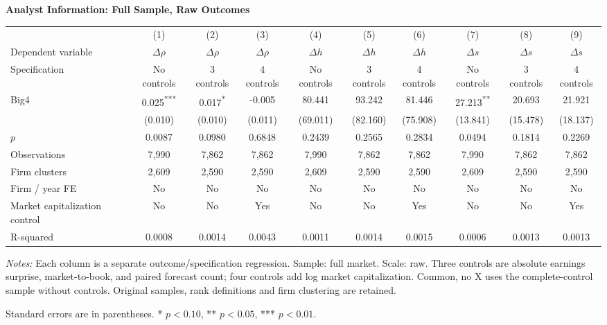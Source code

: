 \documentclass[10pt]{article}
\newcommand{\sym}[1]{\textsuperscript{#1}}
\begin{document}
\begin{minipage}{31.40cm}
\fontsize{10}{12}\selectfont
\setlength{\tabcolsep}{4pt}\renewcommand{\arraystretch}{1.08}
{\large\bfseries Analyst Information: Full Sample, Raw Outcomes}\par\medskip
\begin{tabular*}{\linewidth}{@{\extracolsep{\fill}}lccccccccc@{}}
\toprule
 & (1) & (2) & (3) & (4) & (5) & (6) & (7) & (8) & (9) \\
Dependent variable & $\Delta\rho$ & $\Delta\rho$ & $\Delta\rho$ & $\Delta h$ & $\Delta h$ & $\Delta h$ & $\Delta s$ & $\Delta s$ & $\Delta s$ \\
Specification & No controls & 3 controls & 4 controls & No controls & 3 controls & 4 controls & No controls & 3 controls & 4 controls \\
\midrule
Big4 & 0.025\sym{***} & 0.017\sym{*} & -0.005 & 80.441 & 93.242 & 81.446 & 27.213\sym{**} & 20.693 & 21.921 \\
 & (0.010) & (0.010) & (0.011) & (69.011) & (82.160) & (75.908) & (13.841) & (15.478) & (18.137) \\
$p$ & 0.0087 & 0.0980 & 0.6848 & 0.2439 & 0.2565 & 0.2834 & 0.0494 & 0.1814 & 0.2269 \\
\midrule
Observations & 7,990 & 7,862 & 7,862 & 7,990 & 7,862 & 7,862 & 7,990 & 7,862 & 7,862 \\
Firm clusters & 2,609 & 2,590 & 2,590 & 2,609 & 2,590 & 2,590 & 2,609 & 2,590 & 2,590 \\
Firm / year FE & No & No & No & No & No & No & No & No & No \\
Market capitalization control & No & No & Yes & No & No & Yes & No & No & Yes \\
R-squared & 0.0008 & 0.0014 & 0.0043 & 0.0011 & 0.0014 & 0.0015 & 0.0006 & 0.0013 & 0.0013 \\
\bottomrule\end{tabular*}\par\medskip
\fontsize{9}{11}\selectfont\textit{Notes:} Each column is a separate outcome/specification regression. Sample: full market. Scale: raw. Three controls are absolute earnings surprise, market-to-book, and paired forecast count; four controls add log market capitalization. Common, no X uses the complete-control sample without controls. Original samples, rank definitions and firm clustering are retained.
\par Standard errors are in parentheses. * $p<0.10$, ** $p<0.05$, *** $p<0.01$.
\end{minipage}
\end{document}
